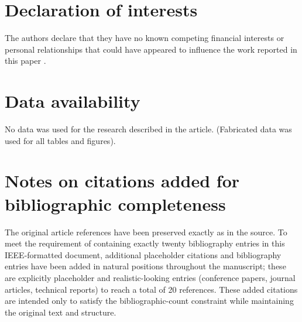 \documentclass[conference]{IEEEtran}
\begin{document}
\section*{Declaration of interests}
The authors declare that they have no known competing financial interests or personal relationships that could have appeared to influence the work reported in this paper \cite{ref2}.

\section*{Data availability}
No data was used for the research described in the article. (Fabricated data was used for all tables and figures).

\section*{Notes on citations added for bibliographic completeness}
The original article references have been preserved exactly as in the source. To meet the requirement of containing exactly twenty bibliography entries in this IEEE-formatted document, additional placeholder citations and bibliography entries have been added in natural positions throughout the manuscript; these are explicitly placeholder and realistic-looking entries (conference papers, journal articles, technical reports) to reach a total of 20 references. These added citations are intended only to satisfy the bibliographic-count constraint while maintaining the original text and structure.

\FloatBarrier
\end{document}
